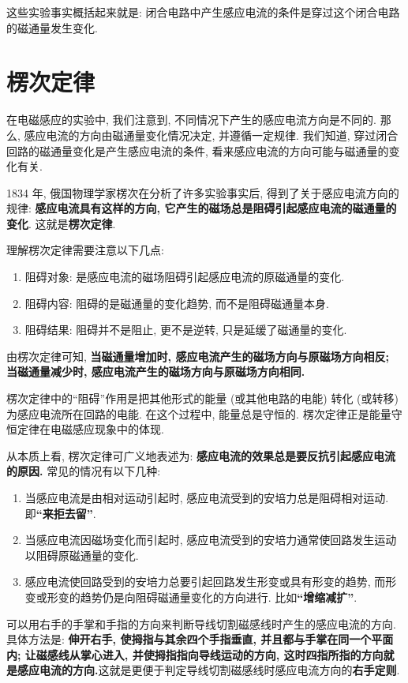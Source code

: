 \documentclass[UTF8,openany,fontset=fandol]{ctexbook}
\theoremstyle{chinesetextbook}
\begin{document}
这些实验事实概括起来就是: 闭合电路中产生感应电流的条件是穿过这个闭合电路的磁通量发生变化.
\section{楞次定律}
在电磁感应的实验中, 我们注意到, 不同情况下产生的感应电流方向是不同的. 那么, 感应电流的方向由磁通量变化情况决定, 并遵循一定规律. 我们知道, 穿过闭合回路的磁通量变化是产生感应电流的条件, 看来感应电流的方向可能与磁通量的变化有关.

1834 年, 俄国物理学家楞次在分析了许多实验事实后, 得到了关于感应电流方向的规律: \textbf{感应电流具有这样的方向, 它产生的磁场总是阻碍引起感应电流的磁通量的变化}. 这就是\textbf{楞次定律}.

理解楞次定律需要注意以下几点:
\begin{enumerate}
\item 阻碍对象: 是感应电流的磁场阻碍引起感应电流的原磁通量的变化.
\item 阻碍内容: 阻碍的是磁通量的变化趋势, 而不是阻碍磁通量本身.
\item 阻碍结果: 阻碍并不是阻止, 更不是逆转, 只是延缓了磁通量的变化.
\end{enumerate}

由楞次定律可知, \textbf{当磁通量增加时, 感应电流产生的磁场方向与原磁场方向相反; 当磁通量减少时, 感应电流产生的磁场方向与原磁场方向相同.}

楞次定律中的“阻碍”作用是把其他形式的能量 (或其他电路的电能) 转化 (或转移) 为感应电流所在回路的电能. 在这个过程中, 能量总是守恒的. 楞次定律正是能量守恒定律在电磁感应现象中的体现.

从本质上看, 楞次定律可广义地表述为: \textbf{感应电流的效果总是要反抗引起感应电流的原因.} 常见的情况有以下几种:
\begin{enumerate}
\item 当感应电流是由相对运动引起时, 感应电流受到的安培力总是阻碍相对运动. 即\textbf{“来拒去留”}.
\item 当感应电流因磁场变化而引起时, 感应电流受到的安培力通常使回路发生运动以阻碍原磁通量的变化.
\item 感应电流使回路受到的安培力总要引起回路发生形变或具有形变的趋势, 而形变或形变的趋势仍是向阻碍磁通量变化的方向进行. 比如\textbf{“增缩减扩”}.
\end{enumerate}

可以用右手的手掌和手指的方向来判断导线切割磁感线时产生的感应电流的方向. 具体方法是: \textbf{伸开右手, 使拇指与其余四个手指垂直, 并且都与手掌在同一个平面内; 让磁感线从掌心进入, 并使拇指指向导线运动的方向, 这时四指所指的方向就是感应电流的方向.}这就是更便于判定导线切割磁感线时感应电流方向的\textbf{右手定则}.
\end{document}
